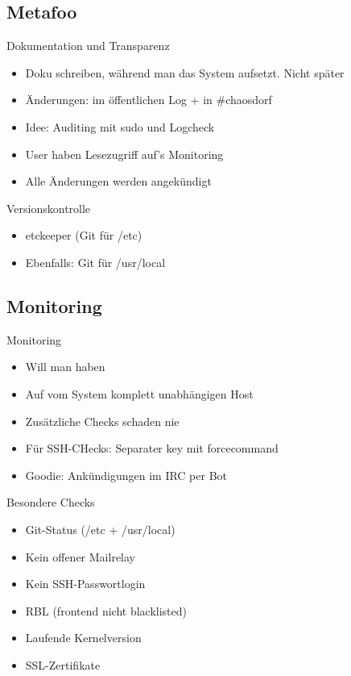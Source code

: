 \documentclass{beamer}
\begin{document}
\subsection{Metafoo}
\begin{frame}{Dokumentation und Transparenz}
	\begin{itemize}
		\item Doku schreiben, während man das System aufsetzt. Nicht später
		\pause \item Änderungen: im öffentlichen Log + in \#chaosdorf
		\pause \item Idee: Auditing mit sudo und Logcheck
		\pause \item User haben Lesezugriff auf's Monitoring
		\pause \item Alle Änderungen werden angekündigt
	\end{itemize}
\end{frame}

\begin{frame}{Versionskontrolle}
	\begin{itemize}
		\item etckeeper (Git für /etc)
		\pause \item Ebenfalls: Git für /usr/local
	\end{itemize}
\end{frame}

\subsection{Monitoring}
\begin{frame}{Monitoring}
	\begin{itemize}
		\item Will man haben
		\pause \item Auf vom System komplett unabhängigen Host
		\pause \item Zusätzliche Checks schaden nie
		\pause \item Für SSH-CHecks: Separater key mit forcecommand
		\pause \item Goodie: Ankündigungen im IRC per Bot
	\end{itemize}
\end{frame}

\begin{frame}{Besondere Checks}
	\begin{itemize}
		\item Git-Status (/etc + /usr/local)
		\pause \item Kein offener Mailrelay
		\pause \item Kein SSH-Passwortlogin
		\pause \item RBL (frontend nicht blacklisted)
		\pause \item Laufende Kernelversion
		\pause \item SSL-Zertifikate
	\end{itemize}
\end{frame}
\end{document}

